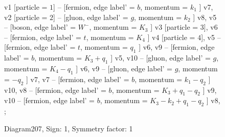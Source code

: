 \documentclass{revtex4}
\begin{document}
\begin{figure}[!htb]
\begin{center}
{    %
v1 [particle = \(1\)] -- [fermion, edge label' = \(b\), momentum = \(k_{1}\) ] v7, 
v2 [particle = \(2\)] -- [gluon, edge label' = \(g\), momentum = \(k_{2}\) ] v8, 
v5 -- [boson, edge label' = \(W^{-}\), momentum = \(K_{3}\) ] v3 [particle = \(3\)], 
v6 -- [fermion, edge label' = \(t\), momentum = \(K_{4}\) ] v4 [particle = \(4\)], 
v5 -- [fermion, edge label' = \(t\), momentum = \(q_{1}\) ] v6, 
v9 -- [fermion, edge label' = \(b\), momentum = \(K_{3} + q_{1}\) ] v5, 
v10 -- [gluon, edge label' = \(g\), momentum = \(K_{4} - q_{1}\) ] v6, 
v9 -- [gluon, edge label' = \(g\), momentum = \(-q_{2}\) ] v7, 
v7 -- [fermion, edge label' = \(b\), momentum = \(k_{1} - q_{2}\) ] v10, 
v8 -- [fermion, edge label' = \(b\), momentum = \(K_{3} + q_{1} - q_{2}\) ] v9, 
v10 -- [fermion, edge label' = \(b\), momentum = \(K_{3} - k_{2} + q_{1} - q_{2}\) ] v8, 
};
\end{center}
\caption{Diagram207, Sign: 1, Symmetry factor: 1}
\end{figure}
\newpage
\end{document}
